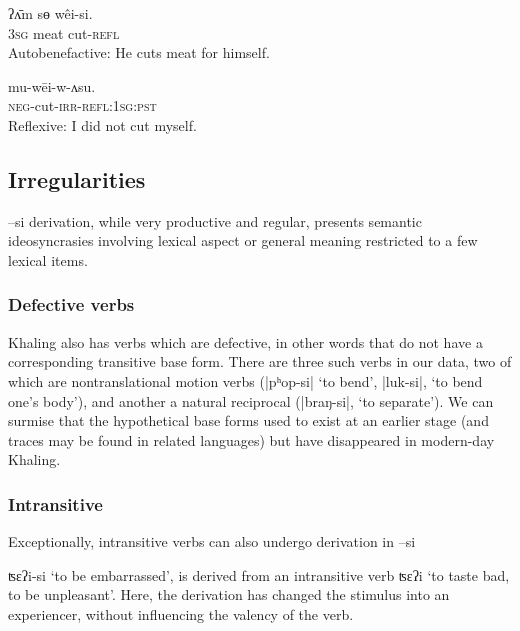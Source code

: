 \documentclass[twoside,a4paper,11pt]{article}
\newcommand{\ipa}[1]{{\phon#1}}
\begin{document}
\begin{exe}
\ex \label{ex:weisi2} 
\gll 
 \ipa{ʔʌ̄m} \ipa{sɵ}  	\ipa{wêi-si.}  \\
\textsc{3sg} meat cut-\textsc{refl} \\
\glt Autobenefactive: He cuts meat for himself.
\end{exe}
 
\begin{exe}
\ex \label{ex:weiwasu} 
\gll 
	\ipa{mu-wēi-w-ʌsu.}  \\
\textsc{neg}-cut-\textsc{irr}-\textsc{refl:1sg:pst} \\
\glt Reflexive: I did not cut myself.
\end{exe}  

 \subsection{Irregularities}
 \ipa{--si} derivation, while very productive and regular, presents semantic ideosyncrasies involving lexical aspect or general meaning restricted to a few lexical items.
  
\subsubsection{Defective verbs}


Khaling also has verbs which are defective, in other words that do not have a corresponding transitive base form. There are three such verbs in our data, two of which are nontranslational motion verbs  (|\ipa{pʰop-si}| `to bend', |\ipa{luk-si}|, `to bend one’s body’), and another a natural reciprocal (|\ipa{braŋ-si}|, `to separate’). We can surmise that the hypothetical base forms used to exist at an earlier stage (and traces may be found in related languages) but have disappeared in modern-day Khaling.

\subsubsection{Intransitive} 
Exceptionally, intransitive verbs can also undergo derivation in \ipa{--si}

 \ipa{ʦɛʔi-si} `to be embarrassed', is derived from an intransitive verb  \ipa{ʦɛʔi} `to taste bad, to be unpleasant'.  Here, the derivation has changed the stimulus into an experiencer, without influencing the valency of the verb.
\end{document}
